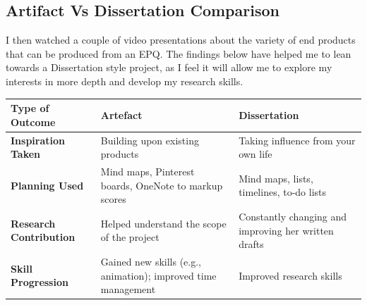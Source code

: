\subsection{Artifact Vs Dissertation Comparison}
I then watched a couple of video presentations about the variety of end products that can be produced from an EPQ. The findings below have helped me to lean towards a Dissertation style project, as I feel it will allow me to explore my interests in more depth and develop my research skills. 

\begin{tabularx}{\textwidth}{@{}lXX@{}}
\toprule
\textbf{Type of Outcome} & \textbf{Artefact} & \textbf{Dissertation} \\
\midrule



\textbf{Inspiration Taken} &
Building upon existing products &
Taking influence from your own life \\

\textbf{Planning Used} &
Mind maps, Pinterest boards, OneNote to markup scores &
Mind maps, lists, timelines, to-do lists \\

\textbf{Research Contribution} &
Helped understand the scope of the project &
Constantly changing and improving her written drafts \\

\textbf{Skill Progression} &
Gained new skills (e.g., animation); improved time management &
Improved research skills \\
\bottomrule
\end{tabularx}